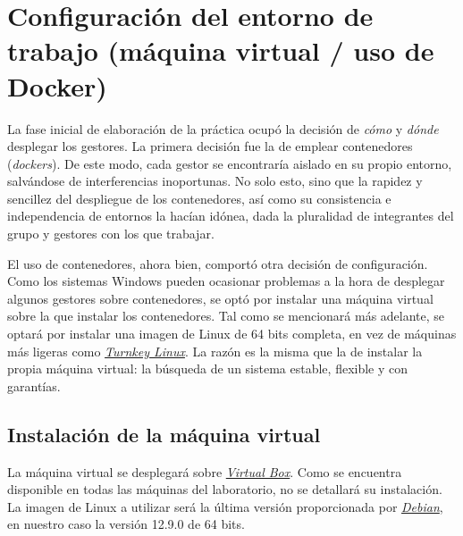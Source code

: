 \documentclass{article}
\begin{document}
\section{Configuración del entorno de trabajo (máquina virtual / uso de Docker)}

La fase inicial de elaboración de la práctica ocupó la decisión de \textit{cómo} y \textit{dónde} desplegar los gestores. La primera decisión fue la de emplear contenedores (\textit{dockers}). De este modo, cada gestor se encontraría aislado en su propio entorno, salvándose de interferencias inoportunas. No solo esto, sino que la rapidez y sencillez del despliegue de los contenedores, así como su consistencia e independencia de entornos la hacían idónea, dada la pluralidad de integrantes del grupo y gestores con los que trabajar.

El uso de contenedores, ahora bien, comportó otra decisión de configuración. Como los sistemas Windows pueden ocasionar problemas a la hora de desplegar algunos gestores sobre contenedores, se optó por instalar una máquina virtual sobre la que instalar los contenedores. Tal como se mencionará más adelante, se optará por instalar una imagen de Linux de 64 bits completa, en vez de máquinas más ligeras como \textit{\textcolor{blue}{\href{https://www.turnkeylinux.org/}{Turnkey Linux}}}. La razón es la misma que la de instalar la propia máquina virtual: la búsqueda de un sistema estable, flexible y con garantías.

\subsection{Instalación de la máquina virtual}\label{subsec:Instalación de la máquina virtual}
La máquina virtual se desplegará sobre   \textit{\textcolor{blue}{\href{https://www.oracle.com/es/virtualization/virtualbox/}{Virtual Box}}}. Como se encuentra disponible en todas las máquinas del laboratorio, no se detallará su instalación. La imagen de Linux a utilizar será la última versión proporcionada por \textit{\textcolor{blue}{\href{https://www.debian.org/index.es.html}{Debian}}}, en nuestro caso la versión 12.9.0 de 64 bits.
\end{document}

